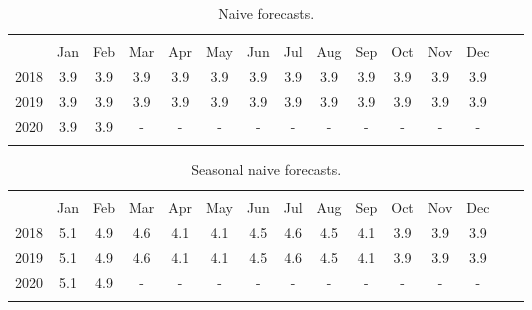 \documentclass[12pt]{article}
\begin{document}
  
\begin{table}[!htbp] \centering 
  \caption{Naive forecasts.} 
  \label{} 
\begin{tabular}{@{\extracolsep{5pt}} ccccccccccccccc} 
\\[-1.8ex]\hline 
\hline \\[-1.8ex] 
& Jan & Feb & Mar & Apr & May & Jun & Jul & Aug & Sep & Oct & Nov & Dec \\
2018 & 3.9 & 3.9 & 3.9 & 3.9 & 3.9 & 3.9 & 3.9 & 3.9 & 3.9 & 3.9 & 3.9 & 3.9 \\
2019 & 3.9 & 3.9 & 3.9 & 3.9 & 3.9 & 3.9 & 3.9 & 3.9 & 3.9 & 3.9 & 3.9 & 3.9 \\
2020 & 3.9 & 3.9 & - & - & - & - & - & - & - & - & - & - \\
\hline \\[-1.8ex] 
\end{tabular} 
\end{table} 

\begin{table}[!htbp] \centering 
  \caption{Seasonal naive forecasts.} 
  \label{} 
\begin{tabular}{@{\extracolsep{5pt}} ccccccccccccccc} 
\\[-1.8ex]\hline 
\hline \\[-1.8ex]          
& Jan & Feb & Mar & Apr & May & Jun & Jul & Aug & Sep & Oct & Nov & Dec \\                            
2018 & 5.1 & 4.9 & 4.6 & 4.1 & 4.1 & 4.5 & 4.6 & 4.5 & 4.1 & 3.9 & 3.9 & 3.9 \\
2019 & 5.1 & 4.9 & 4.6 & 4.1 & 4.1 & 4.5 & 4.6 & 4.5 & 4.1 & 3.9 & 3.9 & 3.9 \\
2020 & 5.1 & 4.9 & - & - & - & - & - & - & - & - & - & - \\  
\hline \\[-1.8ex] 
\end{tabular} 
\end{table} 
\break
\end{document}

